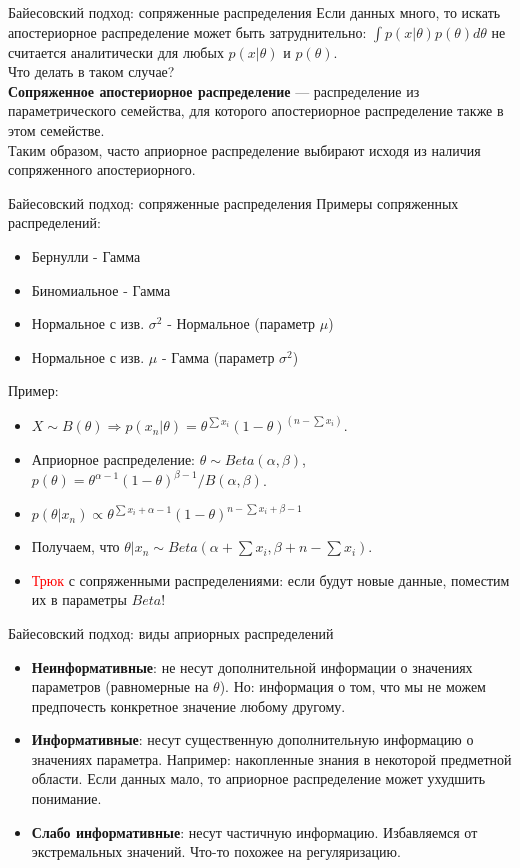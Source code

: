 \documentclass[handout]{beamer}
\begin{document}
\begin{frame}{Байесовский подход: сопряженные распределения}
	Если данных много, то искать апостериорное распределение может быть затруднительно: $\int p(x | \theta)p(\theta)d\theta$ не считается аналитически для любых $p(x|\theta)$ и $p(\theta)$.\\
	Что делать в таком случае?\\
	\textbf{Сопряженное апостериорное распределение} --- распределение из параметрического семейства, для которого апостериорное распределение также в этом семействе.\\
	Таким образом, часто априорное распределение выбирают исходя из наличия сопряженного апостериорного.
\end{frame}

\begin{frame}{Байесовский подход: сопряженные распределения}
Примеры сопряженных распределений:

\begin{itemize}
	\item Бернулли - Гамма
	\item Биномиальное - Гамма
	\item Нормальное с изв. $\sigma^2$ - Нормальное (параметр $\mu$)
	\item Нормальное с изв. $\mu$ - Гамма (параметр $\sigma^2$)
\end{itemize}
Пример:
\begin{itemize}
	\item $X \sim B(\theta) \Rightarrow p(x_n | \theta) = \theta^{\sum x_i}(1-\theta)^{(n-\sum x_i)}$.
	\item Априорное распределение: $\theta \sim Beta(\alpha, \beta)$, $p(\theta)=\theta^{\alpha-1}(1-\theta)^{\beta - 1} / B(\alpha, \beta)$.
	\item $p(\theta | x_n)\propto \theta^{\sum x_i+\alpha-1}(1-\theta)^{n-\sum x_i+\beta-1}$
	\item Получаем, что $\theta|x_n \sim Beta(\alpha + \sum x_i, \beta + n - \sum x_i)$.
	\item \textcolor{red}{Трюк} с сопряженными распределениями: если будут новые данные, поместим их в параметры $Beta$!
\end{itemize}
\end{frame}

\begin{frame}{Байесовский подход: виды априорных распределений}
	\begin{itemize}
		\item \textbf{Неинформативные}: не несут дополнительной информации о значениях параметров (равномерные на $\theta$). Но: информация о том, что мы не можем предпочесть конкретное значение любому другому.
		\item \textbf{Информативные}: несут существенную дополнительную информацию о значениях параметра. Например: накопленные знания в некоторой предметной области. Если данных мало, то априорное распределение может ухудшить понимание.
		\item \textbf{Слабо информативные}: несут частичную информацию. Избавляемся от экстремальных значений. Что-то похожее на регуляризацию.
	\end{itemize}
\end{frame}
\end{document}
